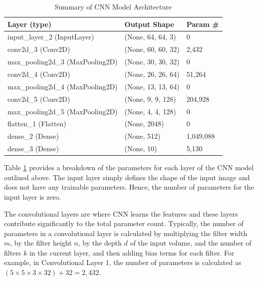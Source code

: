 \begin{table}[htbp]
    \centering    
    \caption{Summary of CNN Model Architecture}
    \label{tab:cnnR}
    \begin{tabular}{|l|l|l|}
    \hline
    \textbf{Layer (type)}             & \textbf{Output Shape}   & \textbf{Param \#} \\
    \hline
    input\_layer\_2 (InputLayer)      & (None, 64, 64, 3)       & 0                 \\
    \hline
    conv2d\_3 (Conv2D)                & (None, 60, 60, 32)      & 2,432             \\
    \hline
    max\_pooling2d\_3 (MaxPooling2D)  & (None, 30, 30, 32)      & 0                 \\
    \hline
    conv2d\_4 (Conv2D)                & (None, 26, 26, 64)      & 51,264            \\
    \hline
    max\_pooling2d\_4 (MaxPooling2D)  & (None, 13, 13, 64)      & 0                 \\
    \hline
    conv2d\_5 (Conv2D)                & (None, 9, 9, 128)       & 204,928           \\
    \hline
    max\_pooling2d\_5 (MaxPooling2D)  & (None, 4, 4, 128)       & 0                 \\
    \hline
    flatten\_1 (Flatten)              & (None, 2048)            & 0                 \\
    \hline
    dense\_2 (Dense)                  & (None, 512)             & 1,049,088         \\
    \hline
    dense\_3 (Dense)                  & (None, 10)              & 5,130             \\
    \hline
    \end{tabular}
\end{table}

Table \ref{tab:cnnR} provides a breakdown of the parameters for each layer of the CNN model outlined above. The input layer simply defines the shape of the input image and does not have any trainable parameters. Hence, the number of parameters for the input layer is zero. 

The convolutional layers are where CNN learns the features and these layers contribute significantly to the total parameter count. Typically, the number of parameters in a convolutional layer is calculated by multiplying the filter width $m$, by the filter height $n$, by the depth $d$ of the input volume, and the number of filters $k$ in the current layer, and then adding bias terms for each filter. For example, in Convolutional Layer 1, the number of parameters is calculated as $(5 \times 5 \times 3 \times 32) + 32 = 2,432$.

